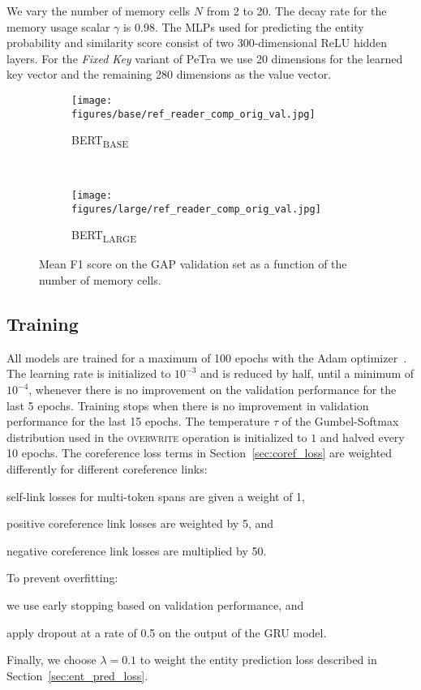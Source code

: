 \documentclass[11pt,a4paper]{article}
\newcommand{\actoverwrite}{\textsc{overwrite}\xspace}
\newcommand{\bertbase}{BERT\textsubscript{BASE}\xspace}
\newcommand{\bertlarge}{BERT\textsubscript{LARGE}\xspace}
\newcommand{\modelname}{PeTra\xspace}
\begin{document}
We vary the number of memory cells $N$
from 2 to 20. The decay rate for the memory usage scalar $\gamma$ is 0.98. The MLPs used for predicting the entity probability and similarity score consist of two 300-dimensional ReLU hidden layers.
For the \emph{Fixed Key} variant of \modelname we use 20 dimensions for the learned key vector and the remaining 280 dimensions as the value vector.


\begin{figure*}[ht]
\centering
\begin{subfigure}[b]{0.5\textwidth}
        \centering
        \texttt{[image: figures/base/ref\_reader\_comp\_orig\_val.jpg]}
        \caption{\bertbase}
        \label{fig:gap_val_small}
    \end{subfigure}~
    \begin{subfigure}[b]{0.5\textwidth}
        \centering
        \texttt{[image: figures/large/ref\_reader\_comp\_orig\_val.jpg]}
        \caption{\bertlarge}
        \label{fig:gap_val_large}
    \end{subfigure}
    \caption{Mean F1 score on the GAP validation set as a function of the number of memory cells.}
    \label{fig:gap_val}
\end{figure*}


\subsection{Training}
All models are trained for a maximum of 100 epochs with the Adam optimizer~\cite{Kingma2015AdamAM}.
The learning rate is initialized to $10^{-3}$
and is reduced by half, until a minimum of $10^{-4}$,
whenever there is no improvement on the validation performance for the last 5 epochs.
Training stops when there is no improvement in validation performance for the last 15 epochs.
The temperature $\tau$ of the Gumbel-Softmax distribution used in the \actoverwrite operation is initialized to $1$ and halved every 10 epochs.
The coreference loss terms in Section~\ref{sec:coref_loss} are weighted differently for different coreference links: \begin{enumerate*}[label=(\alph*)]
    \item self-link losses for multi-token spans are given a weight of 1,
    \item positive coreference link losses are weighted by 5, and
    \item negative coreference link losses are multiplied by 50.
\end{enumerate*}
To prevent overfitting: \begin{enumerate*}[label=(\alph*)]
    \item we use early stopping based on validation performance, and
    \item apply dropout at a rate of 0.5 on the output of the GRU model.
\end{enumerate*}
Finally, we choose $\lambda=0.1$ to weight the entity prediction loss described in Section~\ref{sec:ent_pred_loss}.
\end{document}
